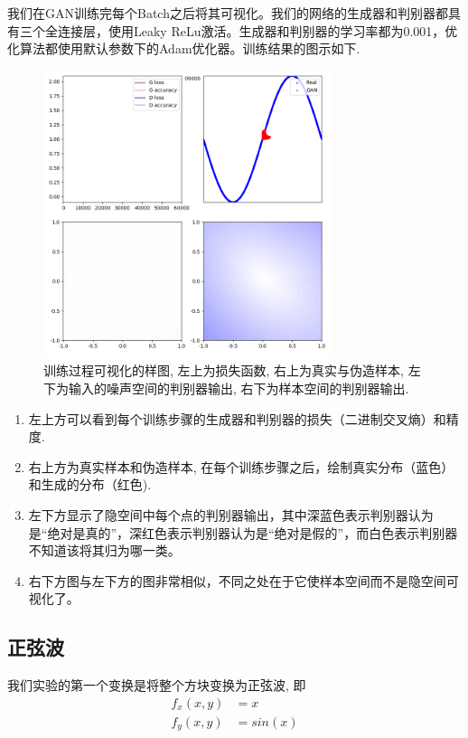 \documentclass[lang=cn,11pt]{elegantpaper}
\begin{document}
我们在GAN训练完每个Batch之后将其可视化。我们的网络的生成器和判别器都具有三个全连接层，使用Leaky ReLu激活。生成器和判别器的学习率都为0.001，优化算法都使用默认参数下的Adam优化器。训练结果的图示如下.

\begin{figure}[hbt]
\centering
  \includegraphics[width=0.75\textwidth]{sin_2_1}
  \caption{训练过程可视化的样图, 左上为损失函数, 右上为真实与伪造样本, 左下为输入的噪声空间的判别器输出, 右下为样本空间的判别器输出.}
\end{figure}

\begin{enumerate}
	\item 左上方可以看到每个训练步骤的生成器和判别器的损失（二进制交叉熵）和精度.
	\item 右上方为真实样本和伪造样本, 在每个训练步骤之后，绘制真实分布（蓝色）和生成的分布（红色).
	\item 左下方显示了隐空间中每个点的判别器输出，其中深蓝色表示判别器认为是“绝对是真的”，深红色表示判别器认为是“绝对是假的”，而白色表示判别器不知道该将其归为哪一类。
	\item 右下方图与左下方的图非常相似，不同之处在于它使样本空间而不是隐空间可视化了。
\end{enumerate}

\subsection{正弦波}

我们实验的第一个变换是将整个方块变换为正弦波, 即
\begin{align}
	f_x(x,y)&=x\\
	f_y(x,y)&=sin(x)
\end{align}
\end{document}
